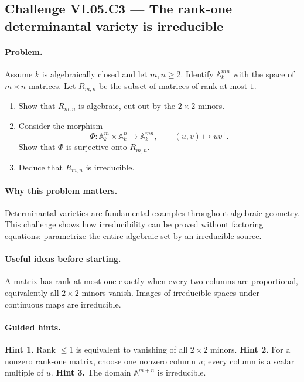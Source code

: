 \subsection*{Challenge VI.05.C3 --- The rank-one determinantal variety is irreducible}
\label{chal:vi05-c3}
\paragraph{Problem.}
Assume \(k\) is algebraically closed and let \(m,n\ge2\).  Identify
\(\mathbb A_k^{mn}\) with the space of \(m\times n\) matrices.  Let \(R_{m,n}\) be the
subset of matrices of rank at most \(1\).

\begin{enumerate}
\item Show that \(R_{m,n}\) is algebraic, cut out by the \(2\times2\) minors.
\item Consider the morphism
\[
\Phi:\mathbb A_k^m\times\mathbb A_k^n\longrightarrow\mathbb A_k^{mn},
\qquad (u,v)\longmapsto uv^{\mathsf T}.
\]
Show that \(\Phi\) is surjective onto \(R_{m,n}\).
\item Deduce that \(R_{m,n}\) is irreducible.
\end{enumerate}
\ifdefined\FullProblemDossiers
\paragraph{Why this problem matters.}
Determinantal varieties are fundamental examples throughout algebraic geometry.  This
challenge shows how irreducibility can be proved without factoring equations: parametrize
the entire algebraic set by an irreducible source.
\paragraph{Useful ideas before starting.}
A matrix has rank at most one exactly when every two columns are proportional, equivalently
all \(2\times2\) minors vanish.  Images of irreducible spaces under continuous maps are
irreducible.
\paragraph{Guided hints.}
\textbf{Hint 1.} Rank \(\le1\) is equivalent to vanishing of all \(2\times2\) minors.
\textbf{Hint 2.} For a nonzero rank-one matrix, choose one nonzero column \(u\); every
column is a scalar multiple of \(u\).
\textbf{Hint 3.} The domain \(\mathbb A^{m+n}\) is irreducible.
